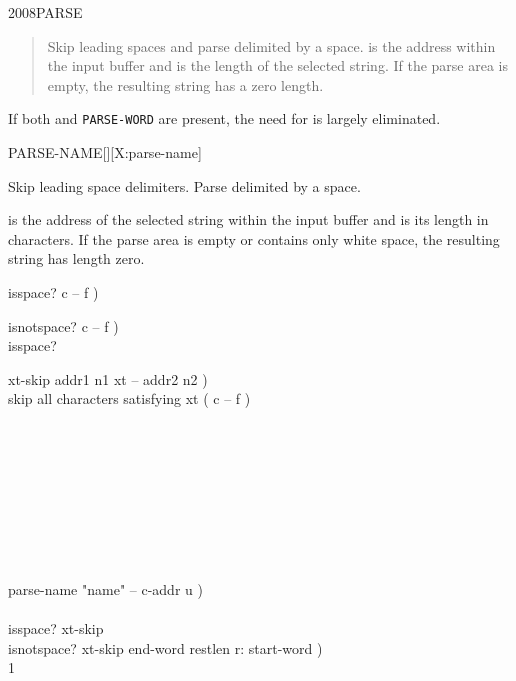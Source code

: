 \begin{worddef}{2008}{PARSE}
\begin{defer}
\begin{enumerate}
\begin{quote}
				Skip leading spaces and parse  delimited by
				a space.  is the address within the input
				buffer and  is the length of the selected string.
				If the parse area is empty, the resulting string has a
				zero length.
			\end{quote}

			If both  and \texttt{PARSE-WORD} are present,
			the need for  is largely eliminated.
		\end{enumerate}
	\end{defer}
\end{worddef}


\begin{worddef}{}{PARSE-NAME}[][X:parse-name]
\item {}

	Skip leading space delimiters. Parse  delimited by a
	space.

	 is the address of the selected string within the
	input buffer and  is its length in characters. If the
	parse area is empty or contains only white space, the resulting
	string has length zero.

	\begin{defer}
	\implementation
		\word{:} isspace?  c -- f ) \\
		\tab {}   \word{;}

		\word{:} isnotspace?  c -- f ) \\
		\tab isspace?  \word{;}

		\word{:} xt-skip  addr1 n1 xt -- addr2 n2 ) \\
		\tab {} skip all characters satisfying xt ( c -- f ) \\
		\tab {} \\
		\tab {} \\
		\tab[2]  \\
		\tab {} \\
		\tab[2]     \\
		\tab {} \\
		  \\
		\tab {}  \\
		\tab {}  \word{;}

		\word{:} parse-name  "name" -- c-addr u ) \\
		\tab {}    \\
		\tab \word{[']} isspace? xt-skip   \\
		\tab \word{[']} isnotspace? xt-skip  end-word restlen r: start-word ) \\
		\tab {} 1  \word{+}   \word{-}  \word{!} \\
		\tab {}   \word{-} \word{;}


\end{defer}
\end{worddef}
